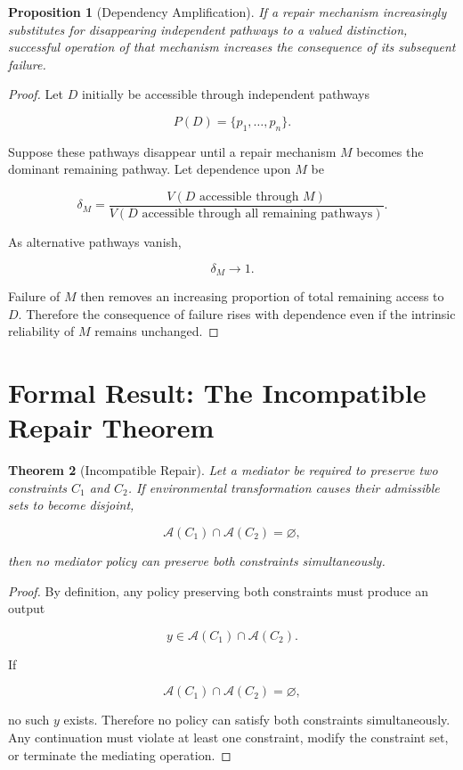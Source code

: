 \documentclass[11pt,oneside]{book}
\newtheorem{theorem}{Theorem}[chapter]
\newtheorem{proposition}[theorem]{Proposition}
\theoremstyle{definition}
\theoremstyle{remark}
\newcommand{\A}{\mathcal{A}}
\begin{document}
\begin{proposition}[Dependency Amplification]
If a repair mechanism increasingly substitutes for disappearing independent pathways to a valued distinction, successful operation of that mechanism increases the consequence of its subsequent failure.
\end{proposition}

\begin{proof}
Let \(D\) initially be accessible through independent pathways

\[
P(D)=\{p_1,\ldots,p_n\}.
\]

Suppose these pathways disappear until a repair mechanism \(M\) becomes the dominant remaining pathway. Let dependence upon \(M\) be

\[
\delta_M
=
\frac{
V(D\text{ accessible through }M)
}{
V(D\text{ accessible through all remaining pathways})
}.
\]

As alternative pathways vanish,

\[
\delta_M\rightarrow1.
\]

Failure of \(M\) then removes an increasing proportion of total remaining access to \(D\). Therefore the consequence of failure rises with dependence even if the intrinsic reliability of \(M\) remains unchanged.
\end{proof}

\section{Formal Result: The Incompatible Repair Theorem}

\begin{theorem}[Incompatible Repair]
Let a mediator be required to preserve two constraints \(C_1\) and \(C_2\). If environmental transformation causes their admissible sets to become disjoint,

\[
\A(C_1)\cap\A(C_2)=\varnothing,
\]

then no mediator policy can preserve both constraints simultaneously.
\end{theorem}

\begin{proof}
By definition, any policy preserving both constraints must produce an output

\[
y\in
\A(C_1)\cap\A(C_2).
\]

If

\[
\A(C_1)\cap\A(C_2)=\varnothing,
\]

no such \(y\) exists. Therefore no policy can satisfy both constraints simultaneously. Any continuation must violate at least one constraint, modify the constraint set, or terminate the mediating operation.
\end{proof}
\end{document}
